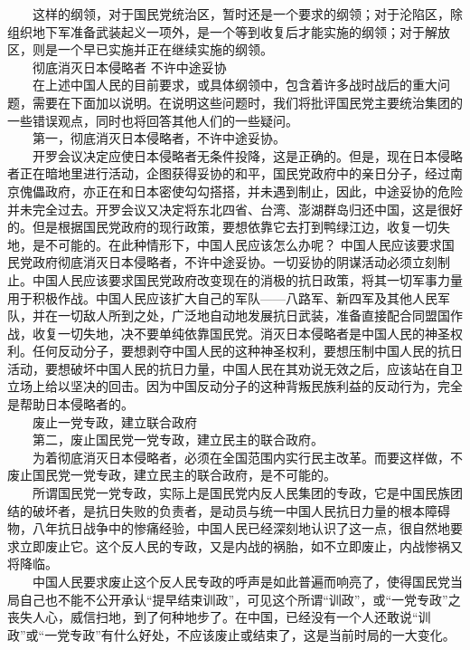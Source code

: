 \documentclass[cn,11pt,chinese]{elegantbook}
\begin{document}
　　这样的纲领，对于国民党统治区，暂时还是一个要求的纲领；对于沦陷区，除组织地下军准备武装起义一项外，是一个等到收复后才能实施的纲领；对于解放区，则是一个早已实施并正在继续实施的纲领。\\
　　彻底消灭日本侵略者 不许中途妥协\\
　　在上述中国人民的目前要求，或具体纲领中，包含着许多战时战后的重大问题，需要在下面加以说明。在说明这些问题时，我们将批评国民党主要统治集团的一些错误观点，同时也将回答其他人们的一些疑问。\\
　　第一，彻底消灭日本侵略者，不许中途妥协。\\
　　开罗会议决定应使日本侵略者无条件投降，这是正确的。但是，现在日本侵略者正在暗地里进行活动，企图获得妥协的和平，国民党政府中的亲日分子，经过南京傀儡政府，亦正在和日本密使勾勾搭搭，并未遇到制止，因此，中途妥协的危险并未完全过去。开罗会议又决定将东北四省、台湾、澎湖群岛归还中国，这是很好的。但是根据国民党政府的现行政策，要想依靠它去打到鸭绿江边，收复一切失地，是不可能的。在此种情形下，中国人民应该怎么办呢？ 中国人民应该要求国民党政府彻底消灭日本侵略者，不许中途妥协。一切妥协的阴谋活动必须立刻制止。中国人民应该要求国民党政府改变现在的消极的抗日政策，将其一切军事力量用于积极作战。中国人民应该扩大自己的军队——八路军、新四军及其他人民军队，并在一切敌人所到之处，广泛地自动地发展抗日武装，准备直接配合同盟国作战，收复一切失地，决不要单纯依靠国民党。消灭日本侵略者是中国人民的神圣权利。任何反动分子，要想剥夺中国人民的这种神圣权利，要想压制中国人民的抗日活动，要想破坏中国人民的抗日力量，中国人民在其劝说无效之后，应该站在自卫立场上给以坚决的回击。因为中国反动分子的这种背叛民族利益的反动行为，完全是帮助日本侵略者的。\\
　　废止一党专政，建立联合政府\\
　　第二，废止国民党一党专政，建立民主的联合政府。\\
　　为着彻底消灭日本侵略者，必须在全国范围内实行民主改革。而要这样做，不废止国民党一党专政，建立民主的联合政府，是不可能的。\\
　　所谓国民党一党专政，实际上是国民党内反人民集团的专政，它是中国民族团结的破坏者，是抗日失败的负责者，是动员与统一中国人民抗日力量的根本障碍物，八年抗日战争中的惨痛经验，中国人民已经深刻地认识了这一点，很自然地要求立即废止它。这个反人民的专政，又是内战的祸胎，如不立即废止，内战惨祸又将降临。\\
　　中国人民要求废止这个反人民专政的呼声是如此普遍而响亮了，使得国民党当局自己也不能不公开承认“提早结束训政”，可见这个所谓“训政”，或“一党专政”之丧失人心，威信扫地，到了何种地步了。在中国，已经没有一个人还敢说“训政”或“一党专政”有什么好处，不应该废止或结束了，这是当前时局的一大变化。\\
\end{document}
